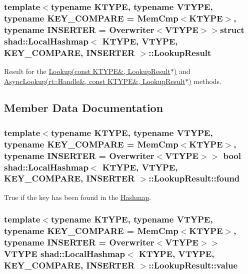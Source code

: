 \subsubsection*{template$<$typename K\-T\-Y\-P\-E, typename V\-T\-Y\-P\-E, typename K\-E\-Y\-\_\-\-C\-O\-M\-P\-A\-R\-E = Mem\-Cmp$<$\-K\-T\-Y\-P\-E$>$, typename I\-N\-S\-E\-R\-T\-E\-R = Overwriter$<$\-V\-T\-Y\-P\-E$>$$>$struct shad\-::\-Local\-Hashmap$<$ K\-T\-Y\-P\-E, V\-T\-Y\-P\-E, K\-E\-Y\-\_\-\-C\-O\-M\-P\-A\-R\-E, I\-N\-S\-E\-R\-T\-E\-R $>$\-::\-Lookup\-Result}

Result for the \hyperlink{classshad_1_1LocalHashmap_a9bd1b3780c1c676ce8d5eae265030080}{Lookup(const K\-T\-Y\-P\-E\&, Lookup\-Result$\ast$)} and \hyperlink{classshad_1_1LocalHashmap_a0328e22adb5dd53e819cc1791e802a56}{Async\-Lookup(rt\-::\-Handle\&, const K\-T\-Y\-P\-E\&, Lookup\-Result$\ast$)} methods. 

\subsection{Member Data Documentation}
\hypertarget{structshad_1_1LocalHashmap_1_1LookupResult_a0298dc2b0fe9122b6b98f6a9bb62e856}{
\subsubsection[{found}]{\setlength{\rightskip}{0pt plus 5cm}template$<$typename K\-T\-Y\-P\-E, typename V\-T\-Y\-P\-E, typename K\-E\-Y\-\_\-\-C\-O\-M\-P\-A\-R\-E = Mem\-Cmp$<$\-K\-T\-Y\-P\-E$>$, typename I\-N\-S\-E\-R\-T\-E\-R = Overwriter$<$\-V\-T\-Y\-P\-E$>$$>$ bool {\bf shad\-::\-Local\-Hashmap}$<$ K\-T\-Y\-P\-E, V\-T\-Y\-P\-E, K\-E\-Y\-\_\-\-C\-O\-M\-P\-A\-R\-E, I\-N\-S\-E\-R\-T\-E\-R $>$\-::Lookup\-Result\-::found}}\label{structshad_1_1LocalHashmap_1_1LookupResult_a0298dc2b0fe9122b6b98f6a9bb62e856}


True if the key has been found in the \hyperlink{classshad_1_1Hashmap}{Hashmap}. 

\hypertarget{structshad_1_1LocalHashmap_1_1LookupResult_a346014daed8f0eafe5abfdd7d4f8227c}{
\subsubsection[{value}]{\setlength{\rightskip}{0pt plus 5cm}template$<$typename K\-T\-Y\-P\-E, typename V\-T\-Y\-P\-E, typename K\-E\-Y\-\_\-\-C\-O\-M\-P\-A\-R\-E = Mem\-Cmp$<$\-K\-T\-Y\-P\-E$>$, typename I\-N\-S\-E\-R\-T\-E\-R = Overwriter$<$\-V\-T\-Y\-P\-E$>$$>$ V\-T\-Y\-P\-E {\bf shad\-::\-Local\-Hashmap}$<$ K\-T\-Y\-P\-E, V\-T\-Y\-P\-E, K\-E\-Y\-\_\-\-C\-O\-M\-P\-A\-R\-E, I\-N\-S\-E\-R\-T\-E\-R $>$\-::Lookup\-Result\-::value}}\label{structshad_1_1LocalHashmap_1_1LookupResult_a346014daed8f0eafe5abfdd7d4f8227c}


